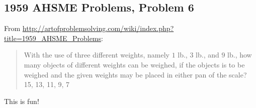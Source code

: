 \subsection{1959 AHSME Problems, Problem 6}

From \url{http://artofproblemsolving.com/wiki/index.php?title=1959_AHSME_Problems}:

\begin{framed}
\begin{quotation}

With the use of three different weights, namely $1$ lb., $3$ lb., and $9$ lb., 
how many objects of different weights can be weighed, if the objects is to be weighed 
and the given weights may be placed in either pan of the scale? 
15, 13, 11, 9, 7

\end{quotation}
\end{framed}

This is fun!

